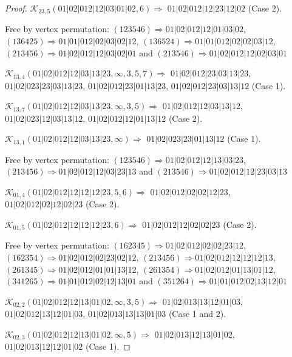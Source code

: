 \documentclass[12pt]{article}
\theoremstyle{plain}
\theoremstyle{definition}
\theoremstyle{remark}
\newcommand{\fancy}[1]{\mathcal{#1}}
\def\K{\fancy{K}}
\begin{document}
\begin{proof}
	$\K_{23,5}(01|02|012|12|03|01|02,6)\Rightarrow $ $01|02|012|12|23|12|02$ (Case 2).
	
	
	
	Free by vertex permutation: $(1 2 3 5 4 6)\Rightarrow 01|02|012|12|01|03|02$, $(1 3 6 4 2 5)\Rightarrow 01|01|012|02|03|02|12$, $(1 3 6 5 2 4)\Rightarrow 01|01|012|02|02|03|12$, $(2 1 3 4 5 6)\Rightarrow 01|02|012|12|03|02|01$ and $(2 1 3 5 4 6)\Rightarrow 01|02|012|12|02|03|01$
	
	
	
	\bigskip
	
	$\K_{13,4}(01|02|012|12|03|13|23,\infty,3, 5, 7)\Rightarrow $ $01|02|012|23|03|13|23$, $01|02|023|23|03|13|23$, $01|02|012|23|01|13|23$, $01|02|012|23|03|13|12$ (Case 1).
	
	$\K_{13,7}(01|02|012|12|03|13|23,\infty,3, 5)\Rightarrow $ $01|02|012|12|03|13|12$, $01|02|023|12|03|13|12$, $01|02|012|12|01|13|12$ (Case 2).
	
	$\K_{13,1}(01|02|012|12|03|13|23,\infty)\Rightarrow $ $01|02|023|23|01|13|12$ (Case 1).
	
	
	
	Free by vertex permutation: $(1 2 3 5 4 6)\Rightarrow 01|02|012|12|13|03|23$, $(2 1 3 4 5 6)\Rightarrow 01|02|012|12|03|23|13$ and $(2 1 3 5 4 6)\Rightarrow 01|02|012|12|23|03|13$
	
	
	
	\bigskip
	
	$\K_{01,4}(01|02|012|12|12|12|23,5, 6)\Rightarrow $ $01|02|012|02|02|12|23$, $01|02|012|02|12|02|23$ (Case 2).
	
	$\K_{01,5}(01|02|012|12|12|12|23,6)\Rightarrow $ $01|02|012|12|02|02|23$ (Case 2).
	
	
	
	Free by vertex permutation: $(1 6 2 3 4 5)\Rightarrow 01|02|012|02|02|23|12$, $(1 6 2 3 5 4)\Rightarrow 01|02|012|02|23|02|12$, $(2 1 3 4 5 6)\Rightarrow 01|02|012|12|12|12|13$, $(2 6 1 3 4 5)\Rightarrow 01|02|012|01|01|13|12$, $(2 6 1 3 5 4)\Rightarrow 01|02|012|01|13|01|12$, $(3 4 1 2 6 5)\Rightarrow 01|01|012|02|12|13|01$ and $(3 5 1 2 6 4)\Rightarrow 01|01|012|02|13|12|01$
	
	
	
	\bigskip
	
	$\K_{02,2}(01|02|012|12|13|01|02,\infty,3, 5)\Rightarrow $ $01|02|013|13|12|01|03$, $01|02|012|13|12|01|03$, $01|02|013|13|13|01|03$ (Case 1 and 2).
	
	$\K_{02,3}(01|02|012|12|13|01|02,\infty,5)\Rightarrow $ $01|02|013|12|13|01|02$, $01|02|013|12|12|01|02$ (Case 1).
	

\end{proof}
\end{document}
